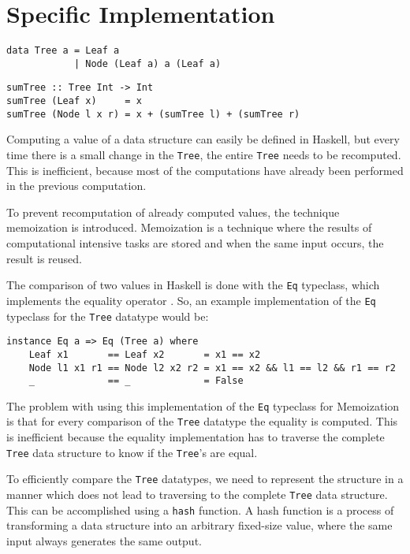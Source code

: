 \chapter{Specific Implementation}
\label{chap-spec-impl}

\begin{verbatim}
data Tree a = Leaf a
            | Node (Leaf a) a (Leaf a)
\end{verbatim}

\begin{verbatim}
sumTree :: Tree Int -> Int
sumTree (Leaf x)     = x
sumTree (Node l x r) = x + (sumTree l) + (sumTree r)
\end{verbatim}

Computing a value of a data structure can easily be defined in Haskell, but every time there is a small change in the \texttt{Tree}, the entire \texttt{Tree} needs to be recomputed. This is inefficient, because most of the computations have already been performed in the previous computation. 

To prevent recomputation of already computed values, the technique memoization is introduced. Memoization is a technique where the results of computational intensive tasks are stored and when the same input occurs, the result is reused. 

The comparison of two values in Haskell is done with the \texttt{Eq} typeclass, which implements the equality operator . So, an example implementation of the \texttt{Eq} typeclass for the \texttt{Tree} datatype would be:

\begin{verbatim}
instance Eq a => Eq (Tree a) where
    Leaf x1       == Leaf x2       = x1 == x2
    Node l1 x1 r1 == Node l2 x2 r2 = x1 == x2 && l1 == l2 && r1 == r2
    _             == _             = False
\end{verbatim}

The problem with using this implementation of the \texttt{Eq} typeclass for Memoization is that for every comparison of the \texttt{Tree} datatype the equality is computed. This is inefficient because the equality implementation has to traverse the complete \texttt{Tree} data structure to know if the \texttt{Tree}'s are equal. 

To efficiently compare the \texttt{Tree} datatypes, we need to represent the structure in a manner which does not lead to traversing to the complete \texttt{Tree} data structure. This can be accomplished using a \texttt{hash} function. A hash function is a process of transforming a data structure into an arbitrary fixed-size value, where the same input always generates the same output. 


